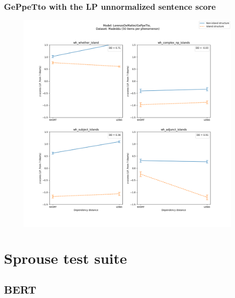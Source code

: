 \subsubsection{GePpeTto with the LP unnormalized sentence score}
\begin{figure}[h]
	\centering
	\includegraphics[width=1\textwidth]{images/AppendixA/Madeddu_wh_LorenzoDeMattei_GePpeTto_LP-zscores-likert-2022-09-14_h15m28s58.png} 
	\label{A-fig:md_gpt_lp}
	\caption{}
\end{figure}


\clearpage
\section{Sprouse test suite}
\subsection{BERT}
